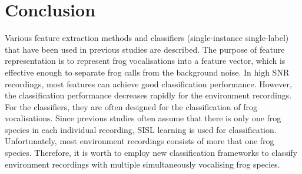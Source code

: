 \section{Conclusion}
Various feature extraction methods and classifiers (single-instance single-label) that have been used in previous studies are described. The purpose of feature representation is to represent frog vocalisations into a feature vector, which is effective enough to separate frog calls from the background noise. In high SNR recordings, most features can achieve good classification performance. However, the classification performance decreases rapidly for the environment recordings. For the classifiers, they are often designed for the classification of frog vocalisations. Since previous studies often assume that there is only one frog species in each individual recording, SISL learning is used for classification. Unfortunately, most environment recordings consists of more that one frog species. Therefore, it is worth to employ new classification frameworks to classify environment recordings with multiple simultaneously vocalising frog species.


